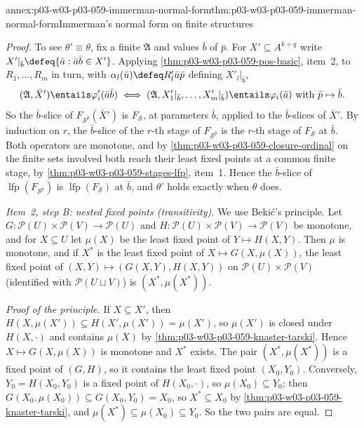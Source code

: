 \begin{annexitem}{annex:p03-w03-p03-059-immerman-normal-form}{thm:p03-w03-p03-059-immerman-normal-form}{Immerman's normal form on finite structures}
\begin{proof}
To see \(\theta'\equiv\theta\), fix a finite \(\mathfrak A\) and values
\(\bar b\) of \(\bar p\). For \(X'\subseteq A^{k+q}\) write
\(X'|_{\bar b}\defeq\{\bar a:\bar a\bar b\in X'\}\). Applying
\cref{thm:p03-w03-p03-059-pos-basic}, item~2, to \(R_1,\ldots,R_m\) in turn,
with \(\alpha_l(\bar u)\defeq R'_l\bar u\bar p\) defining
\(X'_l|_{\bar b}\),
\[
 (\mathfrak A,\bar X')\entails\varphi'_i(\bar a\bar b)\iff
 (\mathfrak A,X'_1|_{\bar b},\ldots,X'_m|_{\bar b})\entails
 \varphi_i(\bar a)\ \text{with }\bar p\mapsto\bar b .
\]
So the \(\bar b\)-slice of \(F_{\mathcal S^{\bar p}}(\bar X')\) is
\(F_{\mathcal S}\), at parameters \(\bar b\), applied to the
\(\bar b\)-slices of \(\bar X'\). By induction on \(r\), the \(\bar b\)-slice
of the \(r\)-th stage of \(F_{\mathcal S^{\bar p}}\) is the \(r\)-th stage
of \(F_{\mathcal S}\) at \(\bar b\). Both operators are monotone, and by
\cref{thm:p03-w03-p03-059-closure-ordinal} on the finite sets involved both
reach their least fixed points at a common finite stage, by
\cref{thm:p03-w03-p03-059-stages-lfp}, item~1. Hence the \(\bar b\)-slice
of \(\operatorname{lfp}(F_{\mathcal S^{\bar p}})\) is
\(\operatorname{lfp}(F_{\mathcal S})\) at \(\bar b\), and \(\theta'\) holds
exactly when \(\theta\) does.

\emph{Item~2, step B: nested fixed points (transitivity).} We use
Beki\'c's principle. Let \(G:\mathcal P(U)\times\mathcal P(V)\to\mathcal
P(U)\) and \(H:\mathcal P(U)\times\mathcal P(V)\to\mathcal P(V)\) be
monotone, and for \(X\subseteq U\) let \(\mu(X)\) be the least fixed point
of \(Y\mapsto H(X,Y)\). Then \(\mu\) is monotone, and if \(X^*\) is the
least fixed point of \(X\mapsto G(X,\mu(X))\), the least fixed point of
\((X,Y)\mapsto(G(X,Y),H(X,Y))\) on \(\mathcal P(U)\times\mathcal P(V)\)
(identified with \(\mathcal P(U\sqcup V)\)) is \((X^*,\mu(X^*))\).

\emph{Proof of the principle.} If \(X\subseteq X'\), then
\(H(X,\mu(X'))\subseteq H(X',\mu(X'))=\mu(X')\), so \(\mu(X')\) is closed
under \(H(X,\cdot)\) and contains \(\mu(X)\) by
\cref{thm:p03-w03-p03-059-knaster-tarski}. Hence \(X\mapsto G(X,\mu(X))\) is
monotone and \(X^*\) exists. The pair \((X^*,\mu(X^*))\) is a fixed point
of \((G,H)\), so it contains the least fixed point \((X_0,Y_0)\).
Conversely, \(Y_0=H(X_0,Y_0)\) is a fixed point of \(H(X_0,\cdot)\), so
\(\mu(X_0)\subseteq Y_0\); then
\(G(X_0,\mu(X_0))\subseteq G(X_0,Y_0)=X_0\), so \(X^*\subseteq X_0\) by
\cref{thm:p03-w03-p03-059-knaster-tarski}, and
\(\mu(X^*)\subseteq\mu(X_0)\subseteq Y_0\). So the two pairs are equal.


\end{proof}
\end{annexitem}

